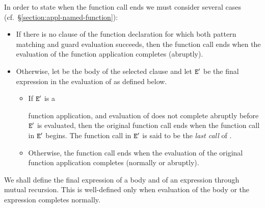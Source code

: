 In order to state when the function call ends we must consider several cases
(cf.~\S\ref{section:appl-named-function}):
\begin{itemize}
\item If there is no clause of the function declaration for which both pattern matching
and guard evaluation succeeds, then the function call ends when the evaluation
of the function application completes (abruptly).
\item Otherwise, let  be the body
of the selected clause and let ${\tt{\sl E}}'$ be the final expression in the evaluation
of  as defined below.
\begin{itemize}
\item If ${\tt{\sl E}}'$ is a
\iffalse remote \fi
function application, and
evaluation of  does not complete abruptly before ${\tt{\sl E}}'$ is evaluated, then
the original function call ends when the function call in ${\tt{\sl E}}'$ begins.
The function call in ${\tt{\sl E}}'$ is said to be the \emph{last call}
of .
\item Otherwise, the function call ends when the evaluation
of the original function application completes (normally or abruptly).
\end{itemize}
\end{itemize}

We shall define the final expression of a body and of an expression through mutual recursion.
This is well-defined only when evaluation of the body or the expression completes
normally.

